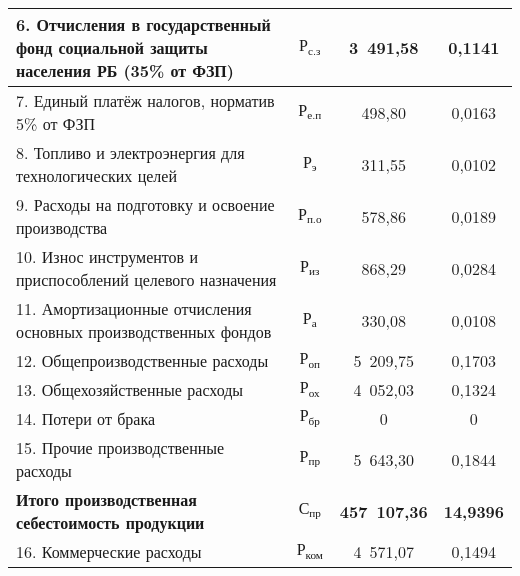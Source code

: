 {\begin{longtable}{| m{10.3cm} | c | c | c |}
      6. Отчисления в государственный фонд социальной \newline
      защиты населения РБ (35\% от ФЗП)
      & \( \text{Р}_{\text{с.з}} \) & 3~491,58 & 0,1141 \\
      \hline

      7. Единый платёж налогов, норматив 5\% от ФЗП
      & \( \text{Р}_{\text{е.п}} \) & 498,80 & 0,0163 \\
      \hline

      8. Топливо и электроэнергия для технологических целей
      & \( \text{Р}_{\text{э}} \) & 311,55 & 0,0102 \\
      \hline

      9. Расходы на подготовку и освоение производства
      & \( \text{Р}_{\text{п.о}} \) & 578,86 & 0,0189 \\
      \hline

      10. Износ инструментов и приспособлений \newline
      целевого назначения
      & \( \text{Р}_{\text{из}} \) & 868,29 & 0,0284 \\
      \hline

      11. Амортизационные отчисления основных \newline
      производственных фондов
      & \( \text{Р}_{\text{а}} \) & 330,08 & 0,0108 \\
      \hline

      12. Общепроизводственные расходы
      & \( \text{Р}_{\text{оп}} \) & 5~209,75 & 0,1703 \\
      \hline

      13. Общехозяйственные расходы
      & \( \text{Р}_{\text{ох}} \) & 4~052,03 & 0,1324 \\
      \hline

      14. Потери от брака
      & \( \text{Р}_{\text{бр}} \) & 0 & 0 \\
      \hline

      15. Прочие производственные расходы
      & \( \text{Р}_{\text{пр}} \) & 5~643,30 & 0,1844 \\
      \hline

      \textbf{Итого \newline производственная себестоимость продукции}
      & \( \mathbf{\text{С}_{\text{пр}}} \) & \textbf{457~107,36} & \textbf{14,9396} \\
      \hline

      16. Коммерческие расходы
      & \( \text{Р}_{\text{ком}} \) & 4~571,07 & 0,1494 \\
      \hline


\end{longtable}}
